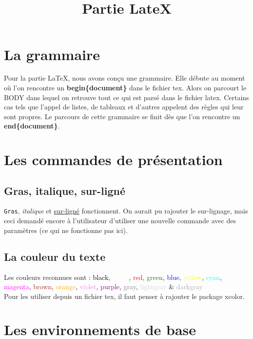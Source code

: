 \documentclass[10pt,a4paper]{report}
\begin{document}
\title{Partie LateX}


\tableofcontents

\section{La grammaire}
Pour la partie LaTeX, nous avons conçu une grammaire. Elle débute au moment où l'on rencontre un {\bf begin\{document\}} dans le fichier tex. Alors on parcourt le BODY dans lequel on retrouve tout ce qui est parsé dans le fichier latex. Certains cas tels que l'appel de listes, de tableaux et d'autres appelent des règles qui leur sont propres. Le parcours de cette grammaire se finit dès que l'on rencontre un {\bf end\{document\}}.

\section{Les commandes de présentation}

\subsection{Gras, italique, sur-ligné}

\texttt{Gras}, \textit{italique} et \underline{sur-ligné} fonctionnent.
On aurait pu rajouter le sur-lignage, mais ceci demandé encore à l'utilisateur d'utiliser une nouvelle commande avec des paramètres (ce qui ne fonctionne pas ici).

\subsection{La couleur du texte}

Les couleurs reconnues sont : \textcolor{black}{black}, \textcolor{white}{white}, \textcolor{red}{red}, \textcolor{green}{green}, \textcolor{blue}{blue}, \textcolor{yellow}{yellow}, \textcolor{cyan}{cyan}, \textcolor{magenta}{magenta}, \textcolor{brown}{brown}, \textcolor{orange}{orange}, \textcolor{violet}{violet}, \textcolor{purple}{purple}, \textcolor{gray}{gray}, \textcolor{lightgray}{lightgray} & \textcolor{darkgray}{darkgray}\\Pour les utiliser depuis un fichier tex, il faut penser à rajouter le package xcolor.


\section{Les environnements de base}
\end{document}
